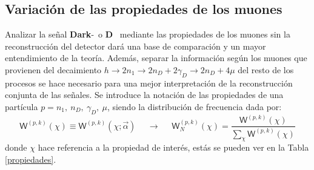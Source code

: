 \subsection{Variación de las propiedades de los muones}

Analizar la señal \textbf{Dark}-\SUSY ~o \MSSM\textbf{D}~ mediante las propiedades de los muones sin la reconstrucción del detector dará una base de comparación y un mayor entendimiento de la teoría. Además, separar la información según los muones que provienen del decaimiento $h \rightarrow 2n_1 \rightarrow 2n_D + 2\gamma_D \rightarrow 2n_D + 4\mu$ del resto de los procesos se hace necesario para una mejor interpretación de la reconstrucción conjunta de las señales. Se introduce la notación de las propiedades de una partícula $p= n_1, ~n_D, ~\gamma_D, ~\mu$, siendo la distribución de frecuencia dada por:
\begin{equation}\label{Wpk}
\textsf{W}^{(p,k)} (\chi) \equiv \textsf{W}^{(p,k)} (\chi; \vec{\alpha}) ~~~~~~ \longrightarrow ~~~~~~ \textsf{W}^{(p,k)}_N (\chi) = \dfrac{\textsf{W}^{(p,k)} (\chi)}{ \sum\limits_\chi \textsf{W}^{(p,k)} (\chi)}
\end{equation}
donde $\chi$ hace referencia a la propiedad de interés, estás se pueden ver en la Tabla \ref{propiedades}.

